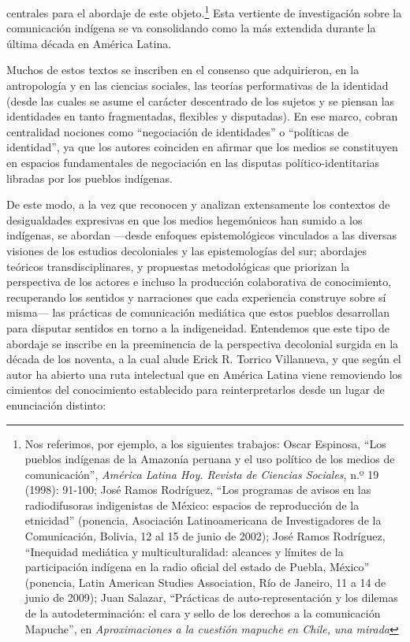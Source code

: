 \documentclass{tufte-handout}
\begin{document}
centrales para el abordaje de este objeto.\footnote{Nos referimos, por
  ejemplo, a los siguientes trabajos: Oscar Espinosa, ``Los pueblos
  indígenas de la Amazonía peruana y el uso político de los medios de
  comunicación'', \emph{América Latina Hoy. Revista de Ciencias
  Sociales}, n.º 19 (1998): 91-100; José
  Ramos Rodríguez, ``Los programas de avisos en las radiodifusoras
  indigenistas de México: espacios de reproducción de la etnicidad''
  (ponencia, Asociación Latinoamericana de Investigadores de la
  Comunicación\emph{,} Bolivia, 12 al 15 de junio de 2002); José Ramos
  Rodríguez, ``Inequidad mediática y multiculturalidad: alcances y
  límites de la participación indígena en la radio oficial del estado de
  Puebla, México'' (ponencia, Latin American Studies Association, Río de
  Janeiro, 11 a 14 de junio de 2009); Juan Salazar, ``Prácticas de
  auto-representación y los dilemas de la autodeterminación: el cara y
  sello de los derechos a la comunicación Mapuche'', en
  \emph{Aproximaciones a la cuestión mapuche en Chile, una mirada}}
Esta vertiente de investigación sobre la comunicación indígena se va
consolidando como la más extendida durante la última década en América
Latina.

Muchos de estos textos se inscriben en el consenso que adquirieron, en
la antropología y en las ciencias sociales, las teorías performativas de
la identidad (desde las cuales se asume el carácter descentrado de los
sujetos y se piensan las identidades en tanto fragmentadas, flexibles y
disputadas). En ese marco, cobran centralidad nociones como
``negociación de identidades'' o ``políticas de identidad'', ya que los
autores coinciden en afirmar que los medios se constituyen en espacios
fundamentales de negociación en las disputas político-identitarias
libradas por los pueblos indígenas.

De este modo, a la vez que reconocen y analizan extensamente los
contextos de desigualdades expresivas en que los medios hegemónicos han
sumido a los indígenas, se abordan ---desde enfoques epistemológicos
vinculados a las diversas visiones de los estudios decoloniales y las
epistemologías del sur; abordajes teóricos transdisciplinares, y
propuestas metodológicas que priorizan la perspectiva de los actores e
incluso la producción colaborativa de conocimiento, recuperando los
sentidos y narraciones que cada experiencia construye sobre sí misma---
las prácticas de comunicación mediática que estos pueblos desarrollan
para disputar sentidos en torno a la indigeneidad. Entendemos que este
tipo de abordaje se inscribe en la preeminencia de la perspectiva
decolonial surgida en la década de los noventa, a la cual alude Erick R.
Torrico Villanueva, y que según el autor ha abierto una ruta intelectual
que en América Latina viene removiendo los cimientos del conocimiento
establecido para reinterpretarlos desde un lugar de enunciación
distinto:
\end{document}
